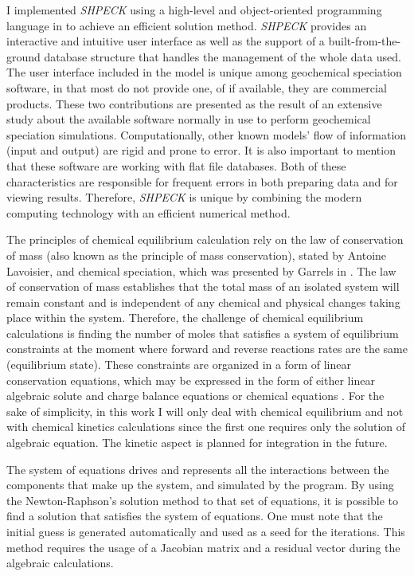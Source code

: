  I implemented \emph{SHPECK} using a high-level and object-oriented programming language in to achieve an efficient solution method. \emph{SHPECK} provides an interactive and intuitive user interface as well as the support of a built-from-the-ground database structure that handles the management of the whole data used. The user interface included in the model is unique among geochemical speciation software, in that most do not provide one, of if available, they are commercial products. These two contributions are presented as the result of an extensive study about the available software normally in use to perform geochemical speciation simulations. Computationally, other known models’ flow of information (input and output) are rigid and prone to error. It is also important to mention that these software are working with flat file databases. Both of these characteristics are responsible for frequent errors in both preparing data and for viewing results. Therefore, \emph{SHPECK} is unique by combining the modern computing technology with an efficient numerical method.


The principles of chemical equilibrium calculation rely on the law of conservation of mass (also known as the principle of mass conservation), stated by Antoine Lavoisier, and chemical speciation, which was presented by Garrels in \cite{Garrels:65}. 
The law of conservation of mass establishes that the total mass of an isolated system will remain constant and is independent of any chemical and physical changes taking place within the system. Therefore, the challenge of chemical equilibrium calculations is finding the number of moles that satisfies a system of equilibrium constraints at the moment where forward and reverse reactions rates are the same (equilibrium state). 
These constraints are organized in a form of linear conservation equations, which may be expressed in the form of either linear algebraic solute and charge balance equations or chemical equations \cite{SmithMissen83}. For the sake of simplicity, in this work I will only deal with chemical equilibrium and not with chemical kinetics calculations since the first one requires only the solution of algebraic equation. The kinetic aspect is planned for integration in the future.


The system of equations drives and represents all the interactions between the components that make up the system, and simulated by the program. By using the Newton-Raphson's solution method to that set of equations, it is possible to find a solution that satisfies the system of equations.  One must note that the initial guess is generated automatically and used as a seed for the iterations. 
This method requires the usage of a Jacobian matrix and a residual vector during the algebraic calculations. 


